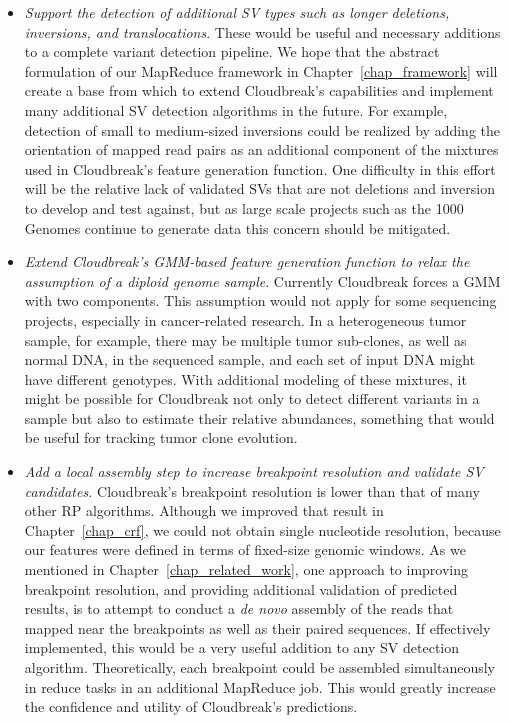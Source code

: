 \begin{itemize}
 \item \emph{Support the detection of additional SV types such as longer deletions, inversions, and translocations}. These would be useful and necessary additions to a complete variant detection pipeline. We hope that the abstract formulation of our MapReduce framework in Chapter~\ref{chap_framework} will create a base from which to extend Cloudbreak's capabilities and implement many additional SV detection algorithms in the future. For example, detection of small to medium-sized inversions could be realized by adding the orientation of mapped read pairs as an additional component of the mixtures used in Cloudbreak's feature generation function. One difficulty in this effort will be the relative lack of validated SVs that are not deletions and inversion to develop and test against, but as large scale projects such as the 1000 Genomes continue to generate data this concern should be mitigated.
 \item \emph{Extend Cloudbreak's GMM-based feature generation function to relax the assumption of a diploid genome sample}. Currently Cloudbreak forces a GMM with two components. This assumption would not apply for some sequencing projects, especially in cancer-related research. In a heterogeneous tumor sample, for example, there may be multiple tumor sub-clones, as well as normal DNA, in the sequenced sample, and each set of input DNA might have different genotypes. With additional modeling of these mixtures, it might be possible for Cloudbreak not only to detect different variants in a sample but also to estimate their relative abundances, something that would be useful for tracking tumor clone evolution.
 \item \emph{Add a local assembly step to increase breakpoint resolution and validate SV candidates.} Cloudbreak's breakpoint resolution is lower than that of many other RP algorithms. Although we improved that result in Chapter~\ref{chap_crf}, we could not obtain single nucleotide resolution, because our features were defined in terms of fixed-size genomic windows. As we mentioned in Chapter~\ref{chap_related_work}, one approach to improving breakpoint resolution, and providing additional validation of predicted results, is to attempt to conduct a \emph{de novo} assembly of the reads that mapped near the breakpoints as well as their paired sequences. If effectively implemented, this would be a very useful addition to any SV detection algorithm. Theoretically, each breakpoint could be assembled simultaneously in reduce tasks in an additional MapReduce job. This would greatly increase the confidence and utility of Cloudbreak's predictions.

\end{itemize}
